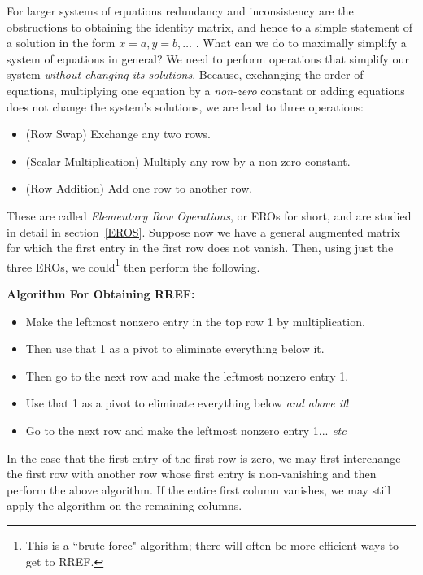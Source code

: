 For larger systems of equations redundancy and inconsistency are the obstructions to obtaining the identity matrix, and hence to a simple statement of a solution in the form $x=a,y=b,\ldots$ . 
What can we do to maximally simplify a system of equations in general?
We need to perform operations that simplify our system {\itshape without changing its solutions}.
Because, exchanging the order of equations, multiplying one equation by a {\itshape non-zero} constant or adding equations does not 
change the system's solutions, we are lead to three operations:
\begin{itemize}
\item (Row Swap) Exchange any two rows.
\item (Scalar Multiplication) Multiply any row by a non-zero constant.
\item (Row Addition) Add 
one row to another row.
\end{itemize}
These are called \emph{Elementary Row Operations}, or EROs for short, and are studied in detail in section~\ref{EROS}. 
Suppose now we have a general augmented matrix for which the first entry in the first row does not vanish. 
Then, using just the three EROs, we could\footnote{This is a ``brute force" algorithm;  there will often be more efficient ways to get to RREF.} then perform the following.\\

\newpage
\begin{center}
{\bfseries {\Large Algorithm For Obtaining RREF:}}
\end{center}
\begin{itemize}
\item Make the leftmost nonzero entry in the top row 1 by multiplication.  
\item Then use that 1 as a pivot to eliminate everything below it. 
\item Then go to the next row and make the leftmost nonzero entry 1. 
\item Use that 1 as a pivot to eliminate everything below {\itshape and above it}! 
\item Go to the next row and make the leftmost nonzero entry 1... {\itshape etc}
\end{itemize}
In the case that the first entry of the first row is zero, we may first interchange the first row with another row whose first entry is non-vanishing  and then perform the above algorithm. If the entire first column vanishes, we may still apply the algorithm on the remaining columns.

